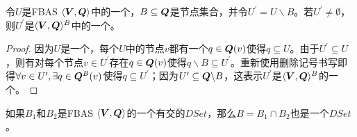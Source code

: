 \begin{theorem}\label{thm:quorum_subset_is_quorum}
        令$U$是FBAS $\langle{\bm V},{\bm Q}\rangle$中的一个{\quorum}，$B\subseteq {\bm Q}$是节点集合，并令$U^\prime=U\backslash B$。若$U^\prime\neq \emptyset$，则$U^\prime$是$\langle{\bm V},{\bm Q}\rangle^B$中的一个{\quorum}。
\end{theorem}

\begin{proof}
        因为$U$是一个{\quorum}，每个$U$中的节点$v$都有一个$q\in{\bm Q}(v)$使得$q\subseteq U$。由于$U^\prime\subseteq U$，则有对每个节点$v\in U^\prime$存在$q\in{\bm Q}(v)$使得$q\backslash B\subseteq U^\prime$。重新使用删除记号书写即得$\forall v\in U^\prime,\exists q\in{\bm Q}^B(v)$使得$q\subseteq U^\prime$；因为$U^\prime \subseteq {\bm Q}\backslash B$，这表示$U^\prime$是$\langle{\bm V},{\bm Q}\rangle^B$的一个{\quorum}。
\end{proof}

\begin{theorem}\label{thm:dset_interset_is_dset}
        如果$B_1$和$B_2$是FBAS $\langle{\bm V},{\bm Q}\rangle$的一个有{\quorum}交的$DSet$，那么$B=B_1\cap B_2$也是一个$DSet$。
\end{theorem}

